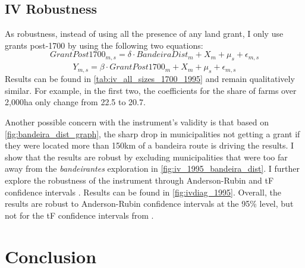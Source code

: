 \documentclass[11pt]{article}
\begin{document}
\subsection{IV Robustness}

As robustness, instead of using all the presence of any land grant, I only use grants post-1700 by using the following two equations:
\begin{equation}
  \label{eqn:firststage_1700}
  GrantPost1700_{m,s} = \delta \cdot BandeiraDist_{m} +  X_{m} + \mu_s  + \epsilon_{m,s}
\end{equation}
\begin{equation}
  \label{eqn:ivequation_1700}
  Y_{m,s} = \beta \cdot \widehat{GrantPost1700}_{m} + X_{m} + \mu_s +  \epsilon_{m,s}
\end{equation}
Results can be found in \autoref{tab:iv_all_sizes_1700_1995} and remain qualitatively similar.
For example, in the first two, the coefficients for the share of farms over 2,000ha only change from 22.5 to 20.7. 

Another possible concern with the instrument's validity is that based on \autoref{fig:bandeira_dist_graph}, the sharp drop in municipalities not getting a grant if they were located more than 150km of a bandeira route is driving the results.
I show that the results are robust by excluding municipalities that were too far away from the \textit{bandeirantes} exploration in \autoref{fig:iv_1995_bandeira_dist}.
I further explore the robustness of the instrument through Anderson-Rubin and tF confidence intervals \parencite{Anderson1949-aa, Lee2022-jw}. Results can be found in \autoref{fig:ivdiag_1995}. Overall, the results are robust to Anderson-Rubin confidence intervals at the 95\% level, but not for the tF confidence intervals from \textcite{Lee2022-jw}.




\section{Conclusion}
\label{sec:conclusion}
\end{document}
